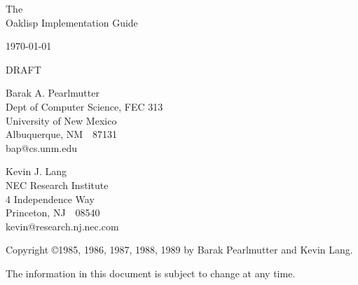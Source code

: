 %
%
%


\begin{titlepage}

\begin{center}

\vspace*{1in}

\Huge
 The \\
 Oaklisp Implementation Guide \\

\vspace{.5in}

\large
 \today \\

\vspace{.25in}

\Huge
 DRAFT \\

\vspace{.5in}

\Large
 Barak A. Pearlmutter \\
\large
 Dept of Computer Science, FEC 313\\
 University of New Mexico\\
 Albuquerque, NM~~87131\\
 bap@cs.unm.edu\\

\vspace{.5in}

\Large
 Kevin J. Lang \\
\large
 NEC Research Institute \\
 4 Independence Way \\
 Princeton, NJ~~08540 \\
 kevin@research.nj.nec.com

\vfill

\normalsize
 Copyright \copyright 1985, 1986, 1987, 1988, 1989
 by Barak Pearlmutter and Kevin Lang.

\vspace{0.25in}

 The information in this document is subject to change at any time.

\end{center}

\end{titlepage}
